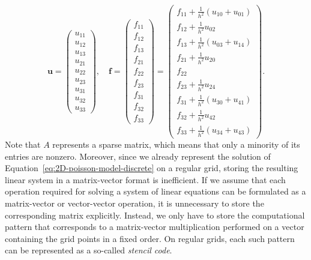 \begin{equation*}
	\bm u = \begin{pmatrix}
	u_{11} \\ u_{12} \\ u_{13} \\ u_{21} \\ u_{22} \\ u_{23} \\ u_{31} \\ u_{32} \\ u_{33}
\end{pmatrix}, \quad
\bm f = \begin{pmatrix}
f_{11} \\
f_{12} \\ 
f_{13} \\ 
f_{21} \\ 
f_{22} \\
f_{23} \\
f_{31} \\ 
f_{32} \\
f_{33}
\end{pmatrix} = 
\begin{pmatrix}
	f_{11} + \frac{1}{h^2} (u_{10} + u_{01}) \\f_{12} + \frac{1}{h^2} u_{02} \\ f_{13} + \frac{1}{h^2} (u_{03} + u_{14})  \\ f_{21} + \frac{1}{h^2} u_{20} \\ f_{22} \\ f_{23} + \frac{1}{h^2} u_{24} \\ f_{31} + \frac{1}{h^2} (u_{30} + u_{41}) \\ f_{32} + \frac{1}{h^2} u_{42} \\ f_{33} + \frac{1}{h^2} (u_{34} + u_{43})
\end{pmatrix}.
\end{equation*}
Note that $A$ represents a sparse matrix, which means that only a minority of its entries are nonzero.
Moreover, since we already represent the solution of Equation~\eqref{eq:2D-poisson-model-discrete} on a regular grid, storing the resulting linear system in a matrix-vector format is inefficient.
If we assume that each operation required for solving a system of linear equations can be formulated as a matrix-vector or vector-vector operation, it is unnecessary to store the corresponding matrix explicitly.
Instead, we only have to store the computational pattern that corresponds to a matrix-vector multiplication performed on a vector containing the grid points in a fixed order.
On regular grids, each such pattern can be represented as a so-called \emph{stencil code}.

